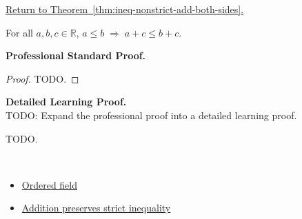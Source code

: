 \newpage
{}
\label{prf:ineq-nonstrict-add-both-sides}

\begin{remark*}[Return]
\hyperref[thm:ineq-nonstrict-add-both-sides]{Return to Theorem~\ref*{thm:ineq-nonstrict-add-both-sides}.}
\end{remark*}

\begin{theorem*}
For all $a, b, c \in \mathbb{R}$,
$a \le b \;\Rightarrow\; a + c \le b + c$.
\end{theorem*}

\textbf{Professional Standard Proof.}~\\
\begin{proof}
TODO.
\end{proof}

\textbf{Detailed Learning Proof.}~\\
TODO: Expand the professional proof into a detailed learning proof.


\begin{remark*}
TODO.
\end{remark*}

\begin{remark*}[Dependencies]~\\
\begin{itemize}
  \item \hyperref[def:ordered-field]{Ordered field}
  \item \hyperref[thm:ineq-add-both-sides]{Addition preserves strict inequality}
\end{itemize}
\end{remark*}
